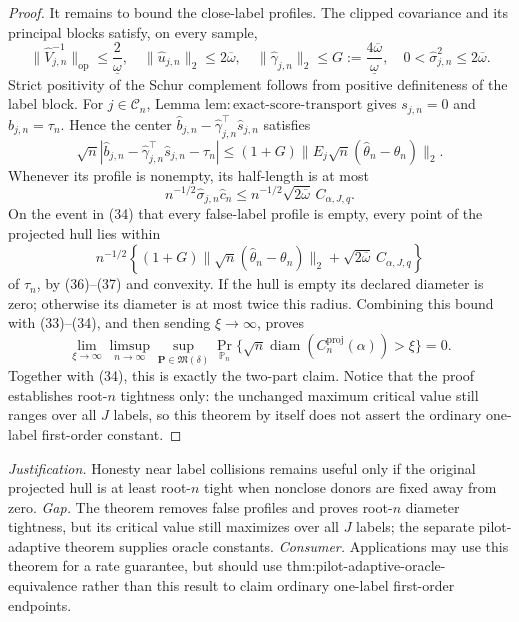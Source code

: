 \documentclass{article}
\begin{document}
\begin{proof}
It remains to bound the close-label profiles.  The clipped covariance and its principal blocks satisfy, on every sample,
\[
 \|\widehat V_{j,n}^{-1}\|_{\mathrm{op}}
 \le\frac2{\underline\omega},
 \quad
 \|\widehat u_{j,n}\|_2\le2\overline\omega,
 \quad
 \|\widehat\gamma_{j,n}\|_2
 \le G:=\frac{4\overline\omega}{\underline\omega},
 \quad
 0<\widehat\sigma_{j,n}^2\le2\overline\omega.
\tag{35}
\]
Strict positivity of the Schur complement follows from positive definiteness of the label block.  For \(j\in\mathcal C_n\), Lemma \(\mathrm{lem:exact\text{-}score\text{-}transport}\) gives \(s_{j,n}=0\) and \(b_{j,n}=\tau_n\).  Hence the center
\(
 \widehat b_{j,n}-\widehat\gamma_{j,n}^{\top}\widehat s_{j,n}
\)
satisfies
\[
 \sqrt n\left|
 \widehat b_{j,n}-\widehat\gamma_{j,n}^{\top}\widehat s_{j,n}-\tau_n
 \right|
 \le(1+G)\|E_j\sqrt n(\widehat\theta_n-\theta_n)\|_2.
\tag{36}
\]
Whenever its profile is nonempty, its half-length is at most
\[
 n^{-1/2}\widehat\sigma_{j,n}\widehat c_n
 \le n^{-1/2}\sqrt{2\overline\omega}\,C_{\alpha,J,q}.
\tag{37}
\]
On the event in (34) that every false-label profile is empty, every point of the projected hull lies within
\[
 n^{-1/2}\left\{
 (1+G)\|\sqrt n(\widehat\theta_n-\theta_n)\|_2
 +\sqrt{2\overline\omega}\,C_{\alpha,J,q}
 \right\}
\]
of \(\tau_n\), by (36)--(37) and convexity.  If the hull is empty its declared diameter is zero; otherwise its diameter is at most twice this radius.  Combining this bound with (33)--(34), and then sending \(\xi\to\infty\), proves
\[
 \lim_{\xi\to\infty}\limsup_{n\to\infty}
 \sup_{\mathbf P\in\mathfrak M(\delta)}
 \Pr_{\mathbb P_n}\{\sqrt n\operatorname{diam}
 (C_n^{\mathrm{proj}}(\alpha))>\xi\}=0.
\]
Together with (34), this is exactly the two-part claim.  Notice that the proof establishes root-\(n\) tightness only: the unchanged maximum critical value still ranges over all \(J\) labels, so this theorem by itself does not assert the ordinary one-label first-order constant.
\end{proof}
\par\smallskip\noindent \textit{Justification.} Honesty near label collisions remains useful only if the original projected hull is at least root-\(n\) tight when nonclose donors are fixed away from zero. \textit{Gap.} The theorem removes false profiles and proves root-\(n\) diameter tightness, but its critical value still maximizes over all \(J\) labels; the separate pilot-adaptive theorem supplies oracle constants. \textit{Consumer.} Applications may use this theorem for a rate guarantee, but should use thm:pilot-adaptive-oracle-equivalence rather than this result to claim ordinary one-label first-order endpoints.
\end{document}
